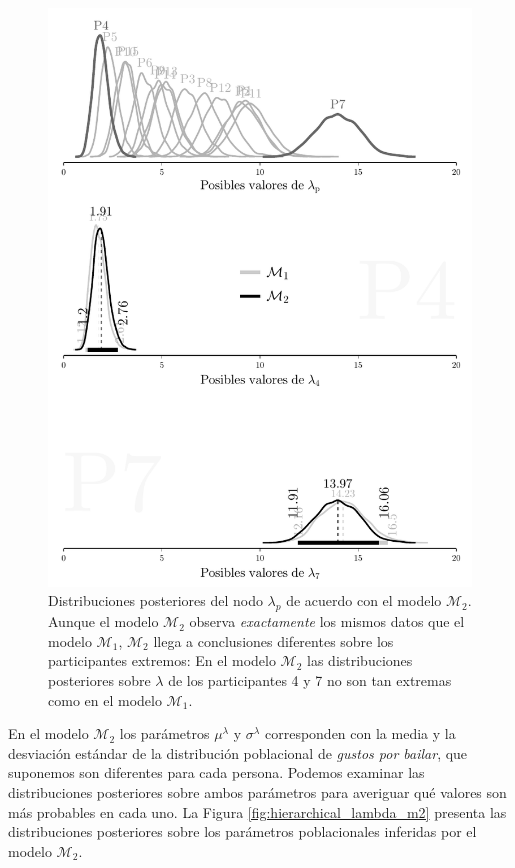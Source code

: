 \documentclass{article}
\begin{document}
\begin{figure}[H]\centerline{\includegraphics[width=1\textwidth]{lambda_m2.pdf}}
\caption{Distribuciones posteriores del nodo $\lambda_p$ de acuerdo con el modelo $\mathcal M_2$. Aunque el modelo $\mathcal M_2$ observa \emph{exactamente} los mismos datos que el modelo $\mathcal M_1$, $\mathcal M_2$ llega a conclusiones diferentes sobre los participantes extremos: En el modelo $\mathcal M_2$ las distribuciones posteriores sobre $\lambda$ de los participantes 4 y 7 no son tan extremas como en el modelo $\mathcal M_1$.}
\label{fig:lambda_m2}
\end{figure}

\indent En el modelo $\mathcal M_2$ los parámetros $\mu^\lambda$ y $\sigma^\lambda$ corresponden con la media y la desviación estándar de la distribución poblacional de \emph{gustos por bailar}, que suponemos son diferentes para cada persona. Podemos examinar las distribuciones posteriores sobre ambos parámetros para averiguar qué valores son más probables en cada uno. La Figura \ref{fig:hierarchical_lambda_m2} presenta las distribuciones posteriores sobre los parámetros poblacionales inferidas por el modelo $\mathcal M_2$.
\end{document}
